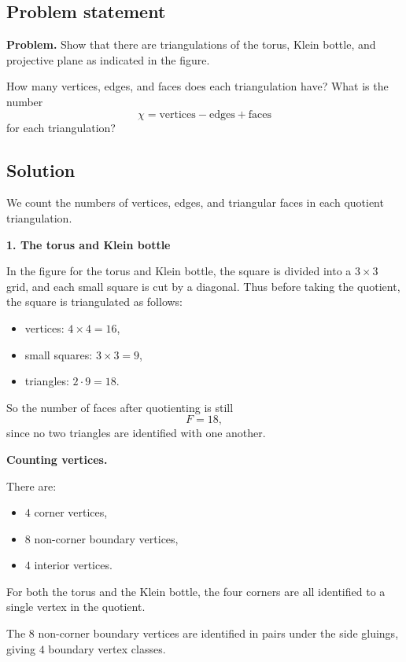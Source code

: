 \documentclass[12pt,a4paper]{article}
\theoremstyle{notespace}
\begin{document}
\subsection{Problem statement}

\textbf{Problem.}
Show that there are triangulations of the torus, Klein bottle, and projective plane as indicated in the figure.

How many vertices, edges, and faces does each triangulation have? What is the number
\[
\chi = \text{vertices} - \text{edges} + \text{faces}
\]
for each triangulation?

\subsection{Solution}

We count the numbers of vertices, edges, and triangular faces in each quotient triangulation.

\bigskip

\textbf{1. The torus and Klein bottle}

In the figure for the torus and Klein bottle, the square is divided into a \(3\times 3\) grid, and each small square is cut by a diagonal. Thus before taking the quotient, the square is triangulated as follows:

\begin{itemize}
	\item vertices: \(4\times 4=16\),
	\item small squares: \(3\times 3=9\),
	\item triangles: \(2\cdot 9=18\).
\end{itemize}

So the number of faces after quotienting is still
\[
F=18,
\]
since no two triangles are identified with one another.

\medskip

\textbf{Counting vertices.}

There are:
\begin{itemize}
	\item \(4\) corner vertices,
	\item \(8\) non-corner boundary vertices,
	\item \(4\) interior vertices.
\end{itemize}

For both the torus and the Klein bottle, the four corners are all identified to a single vertex in the quotient.

The \(8\) non-corner boundary vertices are identified in pairs under the side gluings, giving \(4\) boundary vertex classes.
\end{document}
